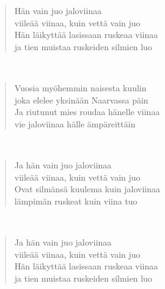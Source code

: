 \noindent\begin{minipage}{\linewidth}
\begin{verse}
	Hän vain juo jaloviinaa\\
	viileää viinaa, kuin vettä vain juo\\
	Hän läikyttää lasissaan ruskeaa viinaa\\
	ja tien muistaa ruskeiden silmien luo\\
\end{verse}
\end{minipage}\\[10pt]
\noindent\begin{minipage}{\linewidth}
\begin{verse}
	Vuosia myöhemmin naisesta kuulin\\
	joka elelee yksinään Naarvassa päin\\
	Ja riutunut mies roudaa hänelle viinaa\\
	vie jaloviinaa hälle ämpäreittäin\\
\end{verse}
\end{minipage}\\[10pt]
\noindent\begin{minipage}{\linewidth}
\begin{verse}
	Ja hän vain juo jaloviinaa\\
	viileää viinaa, kuin vettä vain juo\\
	Ovat silmänsä kuulema kuin jaloviinaa\\
	lämpimän ruskeat kuin viina tuo\\
\end{verse}
\end{minipage}\\[10pt]
\noindent\begin{minipage}{\linewidth}
\begin{verse}
	Ja hän vain juo jaloviinaa\\
	viileää viinaa, kuin vettä vain juo\\
	Hän läikyttää lasissaan ruskeaa viinaa\\
	ja tien muistaa ruskeiden silmien luo\\
\end{verse}
\end{minipage}\\[10pt]
%
%
